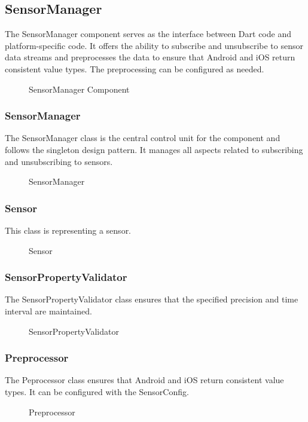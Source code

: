 \documentclass[12pt]{article}
\begin{document}
\subsection{SensorManager}
The SensorManager component serves as the interface between Dart code and platform-specific code. It offers the ability to subscribe and unsubscribe to sensor data streams and preprocesses the data to ensure that Android and iOS return consistent value types. The preprocessing can be configured as needed.
\begin{figure}[ht]
\centering

\caption{\label{fig:bild9} SensorManager Component}
\end{figure}

\subsubsection{SensorManager}
The SensorManager class is the central control unit for the component and follows the singleton design pattern. It manages all aspects related to subscribing and unsubscribing to sensors.
\begin{figure}[ht]
\centering

\caption{\label{fig:bild10} SensorManager}
\end{figure}

\subsubsection{Sensor}
This class is representing a sensor.
\begin{figure}[ht]
\centering

\caption{\label{fig:bild11} Sensor}
\end{figure}

\subsubsection{SensorPropertyValidator}
The SensorPropertyValidator class ensures that the specified precision and time interval are maintained.
\begin{figure}[ht]
\centering

\caption{\label{fig:bild12} SensorPropertyValidator}
\end{figure}
\newpage

\subsubsection{Preprocessor}
The Peprocessor class ensures that Android and iOS return consistent value types. It can be configured with the SensorConfig.
\begin{figure}[ht]
\centering

\caption{\label{fig:bild13} Preprocessor}
\end{figure}
\end{document}
